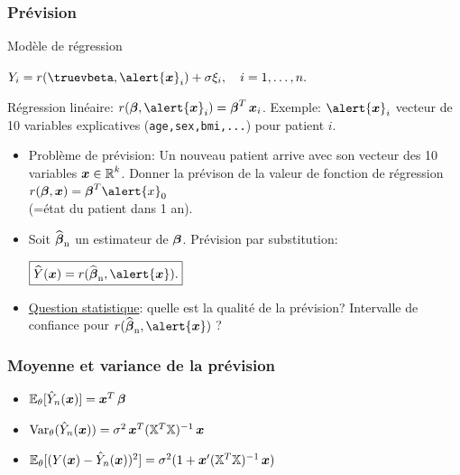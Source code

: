 \begin{frame}
\frametitle{Prévision}

Modèle de régression \vspace{2mm} \centerline{$ Y_i=
r(\truevbeta, \alert{\bx}_i)+ \sigma \xi_i, \quad i=1,\dots,n.$} 
Régression
\alert{linéaire}: $r(\truebeta, \alert{\bx}_i)=\truebeta^T 
\bx_i$. 
Exemple: $\alert{\bx}_i$ vecteur de 10 variables explicatives
(\texttt{age,sex,bmi,...}) pour patient $i$.
\begin{itemize}
\item \alert{Problème de prévision}:
Un nouveau patient arrive avec son vecteur des 10 variables $
\operatorname{\boldsymbol{x}} \in \operatorname{{\mathbb R}}^{k}$. Donner la prévison de la valeur de fonction de
régression $r(\truebeta,  \bx)=\truebeta^T\alert{x}_0$\\
(=état du patient dans 1 an).
\item Soit $\operatorname{\widehat{\boldsymbol{\beta}}_n}$ un estimateur de $\boldsymbol{\beta}$. \alert{Prévision par
substitution:}
 \centerline{$\boxed{ \widehat Y(\bx) = r(\estregress, \alert{\bx}).}$}
\item \underline{Question statistique}: quelle est la qualité de la prévision?
\alert{Intervalle de confiance} pour $r(\estregress, \alert{\bx})$ ?
\end{itemize}
\end{frame}



\begin{frame}
\frametitle{Moyenne et variance de la prévision}
\begin{theorem}
\begin{itemize}
\item $\operatorname{{\mathbb E}}_{\theta}[\hat{Y}_n(\operatorname{\boldsymbol{x}})]= \operatorname{\boldsymbol{x}}^T \boldsymbol{\beta}$
\item $\operatorname{\mathrm{Var}}_{\theta}(\hat{Y}_n(\operatorname{\boldsymbol{x}}))= \sigma^2 \operatorname{\boldsymbol{x}}^T (\mathbb{X}^T \mathbb{X})^{-1} \operatorname{\boldsymbol{x}}$
\item $\operatorname{{\mathbb E}}_{\theta}[ (Y(\operatorname{\boldsymbol{x}}) - \hat{Y}_n(\operatorname{\boldsymbol{x}}))^2]= \sigma^2 (1 + \operatorname{\boldsymbol{x}}' (\mathbb{X}^T \mathbb{X})^{-1} \operatorname{\boldsymbol{x}})$
\end{itemize}
\end{theorem}
\end{frame}


